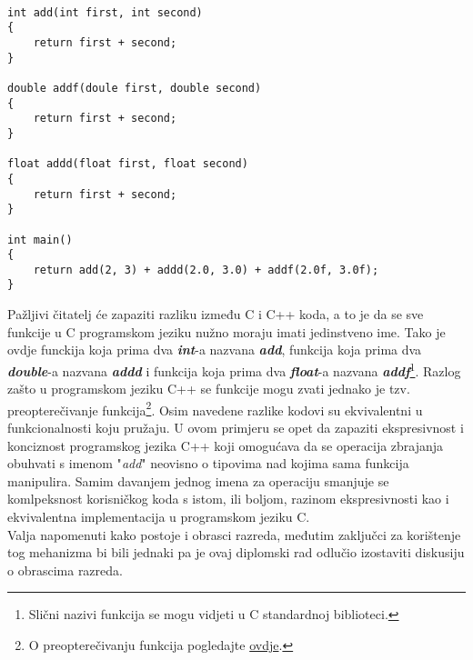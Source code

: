 \lstset{language=C, tabsize=2, frame=single, breaklines=true}
\begin{lstlisting}

int add(int first, int second)
{
    return first + second;
}

double addf(doule first, double second)
{
    return first + second;
}

float addd(float first, float second)
{
    return first + second;
}

int main()
{
    return add(2, 3) + addd(2.0, 3.0) + addf(2.0f, 3.0f);
}
\end{lstlisting}
Pažljivi čitatelj će zapaziti razliku između C i C++ koda, a to je da se sve funkcije u C programskom jeziku nužno moraju imati jedinstveno ime. Tako je ovdje funckija koja prima dva \textbf{\textit{int}}-a nazvana \textbf{\textit{add}}, funkcija koja prima dva \textbf{\textit{double}}-a nazvana \textbf{\textit{addd}} i funkcija koja prima dva \textbf{\textit{float}}-a nazvana \textbf{\textit{addf}}\footnote{Slični nazivi funkcija se mogu vidjeti u C standardnoj biblioteci.}. Razlog zašto u programskom jeziku C++ se funkcije mogu zvati jednako je tzv. preopterečivanje funkcija\footnote{O preopterečivanju funkcija pogledajte \hyperref[subsection:functionOverloading]{ovdje}.}. Osim navedene razlike kodovi su ekvivalentni u funkcionalnosti koju pružaju. U ovom primjeru se opet da zapaziti ekspresivnost i konciznost programskog jezika C++ koji omogućava da se operacija zbrajanja obuhvati s imenom "\textit{add}" neovisno o tipovima nad kojima sama funkcija manipulira. Samim davanjem jednog imena za operaciju smanjuje se komlpeksnost korisničkog koda s istom, ili boljom, razinom ekspresivnosti kao i ekvivalentna implementacija u programskom jeziku C. \\ 
Valja napomenuti kako postoje i obrasci razreda, međutim zaključci za korištenje tog mehanizma bi bili jednaki pa je ovaj diplomski rad odlučio izostaviti diskusiju o obrascima razreda.

